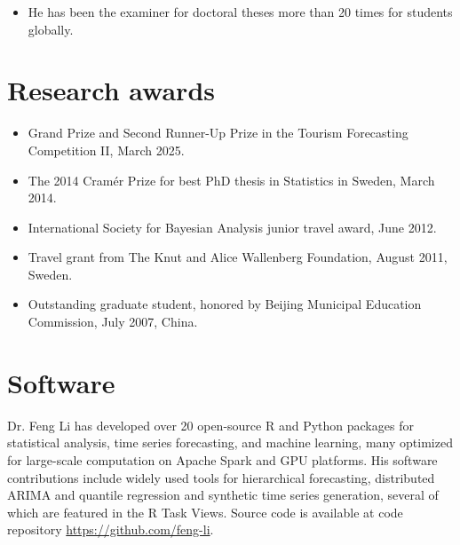 \documentclass[twoside,a4paper]{article}
\begin{document}
\begin{refsection}
\begin{itemize}
\item He has been the examiner for doctoral theses more than 20 times for students globally.
\end{itemize}


\section{Research awards}
\begin{itemize}

\item Grand Prize and Second Runner-Up Prize in the Tourism Forecasting Competition II, March 2025.

\item The 2014 Cramér Prize for best PhD thesis in Statistics in Sweden, March 2014.

\item International Society for Bayesian Analysis junior travel award, June 2012.

\item Travel grant from The Knut and Alice Wallenberg Foundation, August 2011, Sweden.

\item Outstanding graduate student, honored by Beijing Municipal Education Commission, July 2007, China.

\end{itemize}


\newpage
\section{Software}

Dr. Feng Li has developed over 20 open-source R and Python packages for statistical analysis, time series forecasting, and machine learning, many optimized for large-scale computation on Apache Spark and GPU platforms. His software contributions include widely used tools for hierarchical forecasting, distributed ARIMA and quantile regression and synthetic time series generation, several of which are featured in the R Task Views. Source code is available at code repository \url{https://github.com/feng-li}.


\end{refsection}
\end{document}
